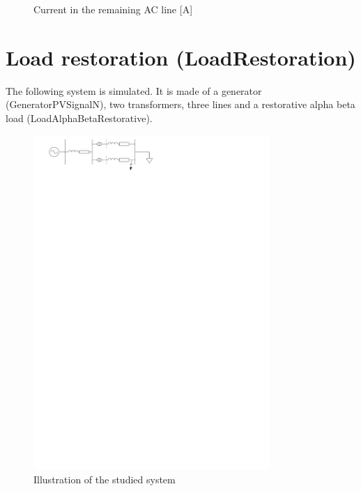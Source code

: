 \documentclass[a4paper, 12pt]{report}
\begin{document}
\begin{figure}[H]
  \caption{Current in the remaining AC line [A]}
\end{figure}

\section{Load restoration (LoadRestoration)}

The following system is simulated. It is made of a generator (GeneratorPVSignalN), two transformers, three lines and a restorative alpha beta load (LoadAlphaBetaRestorative).\\

\begin{figure}[H]
  \begin{center}
  \includegraphics[width=0.8\textwidth]{LoadRestoration/LoadRestoration}
  \end{center}
  \caption{Illustration of the studied system}
\end{figure}
\end{document}
